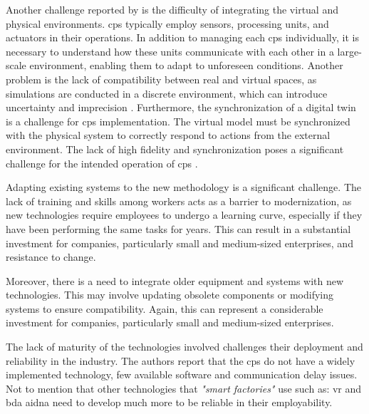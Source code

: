 Another challenge reported by \cite{PENAS201752} is the difficulty of integrating the virtual and physical environments. \acrfull{cps} typically employ sensors, processing units, and actuators in their operations. In addition to managing each \acrfull{cps} individually, it is necessary to understand how these units communicate with each other in a large-scale environment, enabling them to adapt to unforeseen conditions. Another problem is the lack of compatibility between real and virtual spaces, as simulations are conducted in a discrete environment, which can introduce uncertainty and imprecision \cite{Rikalovic2022}. Furthermore, the synchronization of a digital twin is a challenge for \acrfull{cps} implementation. The virtual model must be synchronized with the physical system to correctly respond to actions from the external environment. The lack of high fidelity and synchronization poses a significant challenge for the intended operation of \acrfull{cps} \cite{Zhang2017}.



Adapting existing systems to the new methodology is a significant challenge. The lack of training and skills among workers acts as a barrier to modernization, as new technologies require employees to undergo a learning curve, especially if they have been performing the same tasks for years. This can result in a substantial investment for companies, particularly small and medium-sized enterprises, and resistance to change.

Moreover, there is a need to integrate older equipment and systems with new technologies. This may involve updating obsolete components or modifying systems to ensure compatibility. Again, this can represent a considerable investment for companies, particularly small and medium-sized enterprises.

The lack of maturity of the technologies involved challenges their deployment and reliability in the industry. The authors \textcite{Rikalovic2022} report that the \acrshort{cps} do not have a widely implemented technology, few available software and communication delay issues. Not to mention that other technologies that \emph{"smart factories"} use such as: \acrfull{vr} and \acrfull{bda} aidna need to develop much more to be reliable in their employability.


